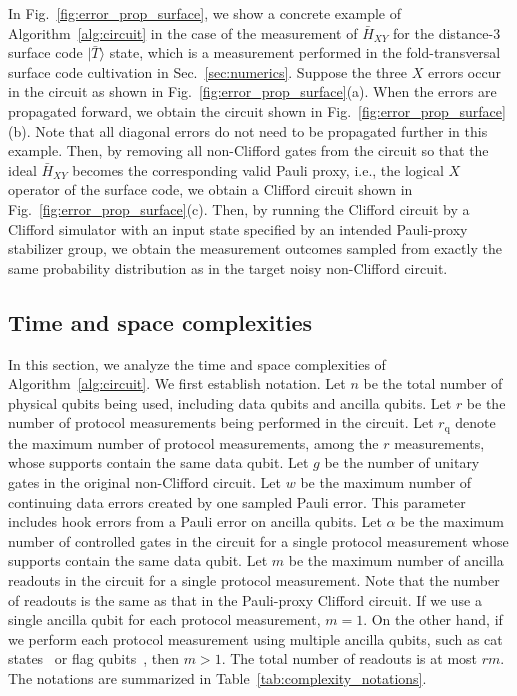 \documentclass[
 reprint,
 amsmath,amssymb,
 pra,superscriptaddress, nofootinbib
]{revtex4-2}
\theoremstyle{definition}
\theoremstyle{plain}
\begin{document}
In Fig.~\ref{fig:error_prop_surface}, we show a concrete example of Algorithm~\ref{alg:circuit} in the case of the measurement of $\bar{H}_{XY}$ for the distance-3 surface code $|\bar{T}\rangle$ state, which is a measurement performed in the fold-transversal surface code cultivation in Sec.~\ref{sec:numerics}.
Suppose the three $X$ errors occur in the circuit as shown in Fig.~\ref{fig:error_prop_surface}(a). 
When the errors are propagated forward, we obtain the circuit shown in Fig.~\ref{fig:error_prop_surface}(b). 
Note that all diagonal errors do not need to be propagated further in this example. 
Then, by removing all non-Clifford gates from the circuit so that the ideal $\bar{H}_{XY}$ becomes the corresponding valid Pauli proxy, i.e., the logical $X$ operator of the surface code, we obtain a Clifford circuit shown in Fig.~\ref{fig:error_prop_surface}(c). 
Then, by running the Clifford circuit by a Clifford simulator with an input state specified by an intended Pauli-proxy stabilizer group, we obtain the measurement outcomes sampled from exactly the same probability distribution as in the target noisy non-Clifford circuit.

\subsection{Time and space complexities}
\label{subsec:complexity}

In this section, we analyze the time and space complexities of Algorithm~\ref{alg:circuit}.
We first establish notation. Let $n$ be the total number of physical qubits being used, including data qubits and ancilla qubits. Let $r$ be the number of protocol measurements being performed in the circuit.
Let $r_\mathrm{q}$ denote the maximum number of protocol measurements, among the $r$ measurements, whose supports contain the same data qubit.
Let $g$ be the number of unitary gates in the original non-Clifford circuit. 
Let $w$ be the maximum number of continuing data errors created by one sampled Pauli error. 
This parameter includes hook errors from a Pauli error on ancilla qubits.
Let $\alpha$ be the maximum number of controlled gates in the circuit for a single protocol measurement whose supports contain the same data qubit.
Let $m$ be the maximum number of ancilla readouts in the circuit for a single protocol measurement.
Note that the number of readouts is the same as that in the Pauli-proxy Clifford circuit.
If we use a single ancilla qubit for each protocol measurement, $m=1$. On the other hand, if we perform each protocol measurement using multiple ancilla qubits, such as cat states~\cite{548464} or flag qubits~\cite{PhysRevLett.121.050502,chao2018fault,Chamberland2018flagfaulttolerant,PRXQuantum.1.010302}, then $m>1$. The total number of readouts is at most $rm$. The notations are summarized in Table~\ref{tab:complexity_notations}.
\end{document}
